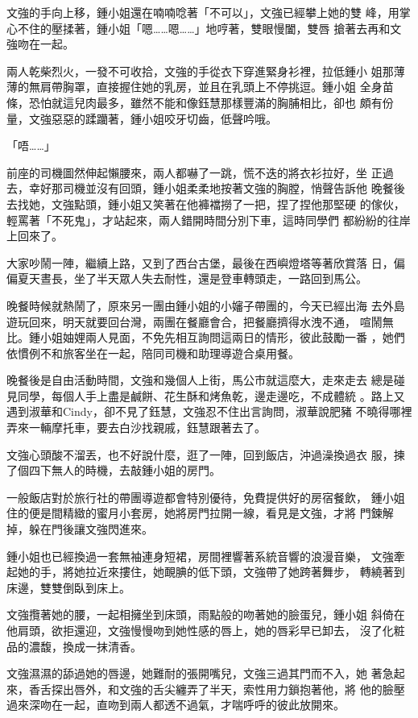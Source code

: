 文強的手向上移，鍾小姐還在喃喃唸著「不可以」，文強已經攀上她的雙
峰，用掌心不住的壓揉著，鍾小姐「嗯……嗯……」地哼著，雙眼慢闔，雙唇
搶著去再和文強吻在一起。

兩人乾柴烈火，一發不可收拾，文強的手從衣下穿進緊身衫裡，拉低鍾小
姐那薄薄的無肩帶胸罩，直接握住她的乳房，並且在乳頭上不停挑逗。鍾小姐
全身苗條，恐怕就這兒肉最多，雖然不能和像鈺慧那樣豐滿的胸脯相比，卻也
頗有份量，文強惡惡的蹂躪著，鍾小姐咬牙切齒，低聲吟哦。

「唔……」

前座的司機圖然伸起懶腰來，兩人都嚇了一跳，慌不迭的將衣衫拉好，坐
正過去，幸好那司機並沒有回頭，鍾小姐柔柔地按著文強的胸膛，悄聲告訴他
晚餐後去找她，文強點頭，鍾小姐又笑著在他褲襠撈了一把，捏了捏他那堅硬
的傢伙，輕罵著「不死鬼」，才站起來，兩人錯開時間分別下車，這時同學們
都紛紛的往岸上回來了。

大家吵鬧一陣，繼續上路，又到了西台古堡，最後在西嶼燈塔等著欣賞落
日，偏偏夏天晝長，坐了半天眾人失去耐性，還是登車轉頭走，一路回到馬公。

晚餐時候就熱鬧了，原來另一團由鍾小姐的小嬸子帶團的，今天已經出海
去外島遊玩回來，明天就要回台灣，兩團在餐廳會合，把餐廳擠得水洩不通，
喧鬧無比。鍾小姐妯娌兩人見面，不免先相互詢問這兩日的情形，彼此鼓勵一番
，她們依慣例不和旅客坐在一起，陪同司機和助理導遊合桌用餐。

晚餐後是自由活動時間，文強和幾個人上街，馬公市就這麼大，走來走去
總是碰見同學，每個人手上盡是鹹餅、花生酥和烤魚乾，邊走邊吃，不成體統
。路上又遇到淑華和Cindy，卻不見了鈺慧，文強忍不住出言詢問，淑華說肥豬
不曉得哪裡弄來一輛摩托車，要去白沙找親戚，鈺慧跟著去了。

文強心頭酸不溜丟，也不好說什麼，逛了一陣，回到飯店，沖過澡換過衣
服，揀了個四下無人的時機，去敲鍾小姐的房門。

一般飯店對於旅行社的帶團導遊都會特別優待，免費提供好的房宿餐飲，
鍾小姐住的便是間精緻的蜜月小套房，她將房門拉開一線，看見是文強，才將
門鍊解掉，躲在門後讓文強閃進來。

鍾小姐也已經換過一套無袖連身短裙，房間裡響著系統音響的浪漫音樂，
文強牽起她的手，將她拉近來摟住，她靦腆的低下頭，文強帶了她跨著舞步，
轉繞著到床邊，雙雙倒臥到床上。

文強攬著她的腰，一起相擁坐到床頭，雨點般的吻著她的臉蛋兒，鍾小姐
斜倚在他肩頭，欲拒還迎，文強慢慢吻到她性感的唇上，她的唇彩早已卸去，
沒了化粧品的濃馥，換成一抹清香。

文強濕濕的舔過她的唇邊，她難耐的張開嘴兒，文強三過其門而不入，她
著急起來，香舌探出唇外，和文強的舌尖纏弄了半天，索性用力鎖抱著他，將
他的臉壓過來深吻在一起，直吻到兩人都透不過氣，才喘呼呼的彼此放開來。

